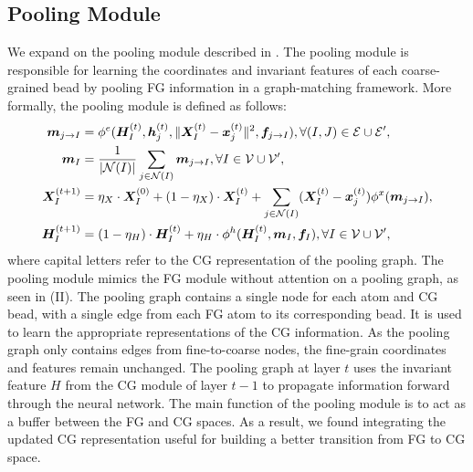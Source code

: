 \subsection{Pooling Module}
\label{section:eqn-pool}
We expand on the pooling module described in . The pooling module is responsible for learning the coordinates and invariant features of each coarse-grained bead by pooling FG information in a graph-matching framework. More formally, the pooling module is defined as follows:
\begin{equation}
\begin{aligned}
\bm{m}_{j\to I} &= \phi^e(\bm{H}_I^{(t)},\bm{h}_j^{(t)},\lVert\bm{X}_I^{(t)}-\bm{x}_j^{(t)}\rVert^2,\bm{f}_{j\to I}),\forall (I,J)\in {\mathcal{E}}\cup{\mathcal{E}}', \\
\bm{m}_I &= \frac{1}{|{\mathcal{N}}(I)|} \sum_{j\in{\mathcal{N}}(I)}\bm{m}_{j\to I},\forall I\in{\mathcal{V}}\cup{\mathcal{V}}', \\
\bm{X}_I^{(t+1)} &= \eta_X \cdot \bm{X}_I^{(0)} + (1 - \eta_X) \cdot \bm{X}_I^{(t)} + \sum_{j\in{\mathcal{N}}(I)} (\bm{X}_I^{(t)}-\bm{x}_j^{(t)})\phi^x(\bm{m}_{j\to I}), \\
\bm{H}_I^{(t+1)} &= (1 - \eta_H) \cdot \bm{H}_I^{(t)} + \eta_H \cdot \phi^h(\bm{H}_I^{(t)},\bm{m}_I, \bm{f}_I),\forall I\in{\mathcal{V}}\cup{\mathcal{V}}',
\end{aligned}
\end{equation}
where capital letters refer to the CG representation of the pooling graph.
The pooling module mimics the FG module without attention on a pooling graph, as seen in (II). The pooling graph contains a single node for each atom and CG bead, with a single edge from each FG atom to its corresponding bead. It is used to learn the appropriate representations of the CG information. As the pooling graph only contains edges from fine-to-coarse nodes, the fine-grain coordinates and features remain unchanged. The pooling graph at layer $t$ uses the invariant feature $H$ from the CG module of layer $t - 1$ to propagate information forward through the neural network. The main function of the pooling module is to act as a buffer between the FG and CG spaces. As a result, we found integrating the updated CG representation useful for building a better transition from FG to CG space.


